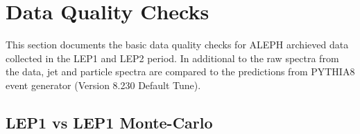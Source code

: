 \section{Data Quality Checks}

This section documents the basic data quality checks for ALEPH archieved data collected in the LEP1 and LEP2 period. In additional to the raw spectra from the data, jet and particle spectra are compared to the predictions from PYTHIA8 event generator (Version 8.230 Default Tune). 

\subsection{LEP1 vs LEP1 Monte-Carlo}
\begin{figure}[H]
\centering
{}\hfill
{}\hfill
{}\hfill
\caption{}  
\end{figure}

\iffalse
\subsection{LEP1 Track Efficiency}
\begin{figure}[H]
\centering
\subfloat{\label{sfig:a}\texttt{[image: images/trkefficiency/ptclean.pdf]}}\hfill
\subfloat{\label{sfig:b}\texttt{[image: images/trkefficiency/thetaclean.pdf]}}\hfill
\subfloat{\label{sfig:c}\texttt{[image: images/trkefficiency/phiclean.pdf]}}\hfill
\caption{Track efficiency for LEP1 data. Cuts used in each plot are listed in the title.}
\end{figure}

\begin{figure}[H]
\centering
\subfloat{\label{sfig:a}\texttt{[image: images/trkefficiency/ptratio.pdf]}}\hfill
\subfloat{\label{sfig:b}\texttt{[image: images/trkefficiency/thetaratio.pdf]}}\hfill
\subfloat{\label{sfig:c}\texttt{[image: images/trkefficiency/phiratio.pdf]}}\hfill
\caption{Track efficiency closure tests for LEP1 data.}
\end{figure}

\fi
